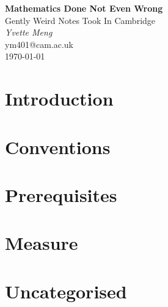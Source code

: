\documentclass[11pt,a4paper]{article}
\begin{document}
\pagestyle{plain}

\begin{center}                  
\vspace{5cm} 

{\LARGE \textbf{Mathematics Done Not Even Wrong}}\\
\vspace{5cm}
{\large Gently Weird Notes Took In Cambridge}\\
\vspace{5cm}
{\Large \textit{Yvette Meng}}\\
\vspace{1cm}
{\large ym401@cam.ac.uk}\\
\vspace{1cm}
{\large \today}
\end{center}
\newpage

\section{Introduction}

\newpage

\section{Conventions}

\newpage

\section{Prerequisites}

\newpage

\section{Measure}

\newpage

\section{Uncategorised}

\end{document}
